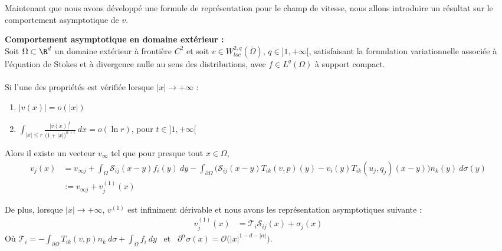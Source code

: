 Maintenant que nous avons développé une formule de représentation pour le champ de vitesse, nous allons introduire un résultat sur le comportement asymptotique de $v$.
\begin{theorembox}
\begin{theorem} \textbf{Comportement asymptotique en domaine extérieur :}\\
    Soit $\Omega \subset \R^d$ un domaine extérieur à frontière $C^2$ et soit $v \in W^{2,q}_{loc}(\overline{\Omega})$, $q \in ]1,+\infty[$, satisfaisant la formulation variationnelle associée à l'équation de Stokes et à divergence nulle au sens des distributions, avec $f\in L^q(\Omega)$ à support compact.\\
    \\
    Si l'une des propriétés est vérifiée lorsque $|x| \longrightarrow +\infty$ :
    \begin{enumerate}
        \item $|v(x)| = o(|x|)$
        \item $\displaystyle \int_{|x| \leq r} \frac{|v(x)|^t}{\big(1 + |x|\big)^{n+t}} \ dx = o(\ln r) $, pour $t \in ]1,+\infty[$
    \end{enumerate}
    
    \vspace{1em}

    Alors il existe un vecteur $v_{\infty}$ tel que pour presque tout $x \in \Omega$,
    \begin{equation}
        \begin{split}
            v_j(x) &= v_{\infty j} + \int_{\Omega} \mathscr{S}_{ij}(x-y)f_i(y) \ dy - \int_{\partial \Omega} \Big( \mathscr{S}_{ij}(x-y) T_{ik}(v,p)(y) - v_i(y)T_{ik}(u_j,q_j)(x-y) \Big) n_k(y) \ d\sigma(y) \label{asymptotique_vitesse} \\
            &:= v_{\infty j} + v_j^{(1)}(x)
        \end{split}
    \end{equation}

     De plus, lorsque $|x| \longrightarrow +\infty$, $v^{(1)}$ est infiniment dérivable et nous avons les représentation asymptotiques suivante :
    \begin{align}
        v_j^{(1)}(x) &= \mathcal{T}_i\mathscr{S}_{ij}(x) + \sigma_j(x) \label{estimation1}
    \end{align}
    Où $ \displaystyle \mathcal{T}_i = - \int_{\partial \Omega} T_{ik}(v,p)n_k \ d\sigma + \int_{\Omega} f_i \ dy $ \ et \ $\partial^{\alpha}\sigma(x) = \mathcal{O}\Big(|x|^{1-d-|\alpha|}\Big) $.

\end{theorem}
\end{theorembox}

